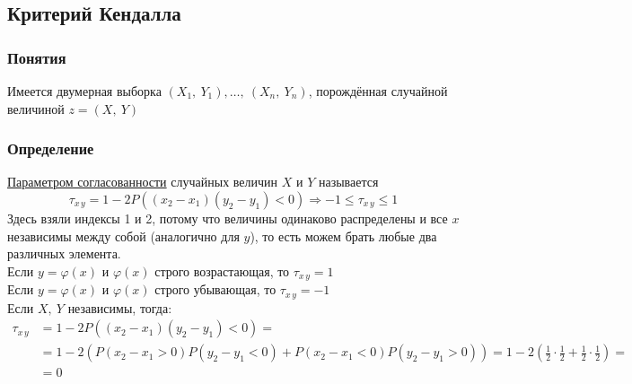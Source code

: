 \documentclass[12pt, a4paper]{article}
\begin{document}
\subsection*{Критерий Кендалла}
\subsubsection*{Понятия}
Имеется двумерная выборка $(X_1,\ Y_1),\dots,\ (X_n,\ Y_n)$, порождённая случайной величиной $z = (X,\ Y)$
\subsubsection*{Определение}
\underline{Параметром согласованности} случайных величин $X$ и $Y$ называется
\[\tau_{x\, y} = 1 - 2P\left( (x_2 - x_1)(y_2 - y_1) < 0 \right) \Rightarrow -1 \leq \tau_{x\, y} \leq 1\]
Здесь взяли индексы 1 и 2, потому что величины одинаково распределены и все $x$ независимы между собой (аналогично для $y$), то есть можем брать любые два различных элемента.\\
Если $y = \varphi(x)$ и $\varphi(x)$ строго возрастающая, то $\tau_{x\, y} = 1$\\
Если $y = \varphi(x)$ и $\varphi(x)$ строго убывающая, то $\tau_{x\, y} = -1$\\
Если $X,\ Y$ независимы, тогда:
\begin{equation*}
    \begin{aligned}
        \tau_{x\, y} &= 1 - 2P\left( (x_2 - x_1)(y_2 - y_1) < 0 \right) =\\
        & = 1 - 2 \left( P(x_2 - x_1 > 0) P(y_2 - y_1 < 0) + P(x_2 - x_1 < 0) P(y_2 - y_1 > 0) \right) = 1 - 2\left( \frac{1}{2} \cdot \frac{1}{2} + \frac{1}{2} \cdot \frac{1}{2} \right) = \\
        & = 0      
    \end{aligned}
\end{equation*}
\end{document}
